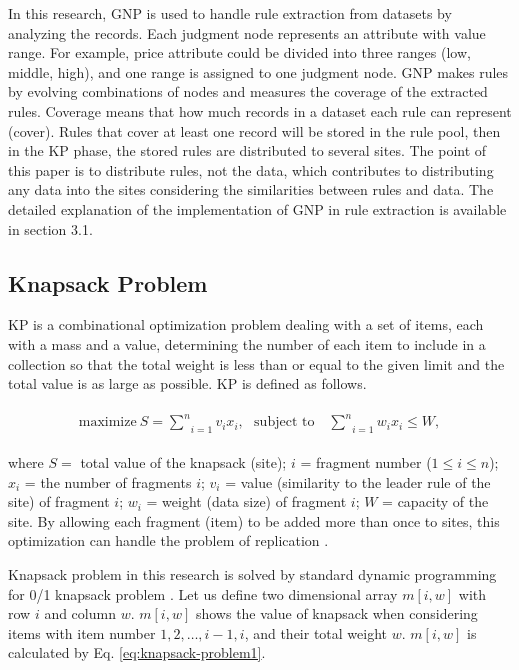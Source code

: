 \documentclass{elsart}
\begin{document}
In this research, GNP is used to handle rule extraction from datasets by analyzing the records. Each judgment node represents an attribute with value range. For example, price attribute could be divided into three ranges (low, middle, high), and one range is assigned to one judgment node. GNP makes rules by evolving combinations of nodes and measures the coverage of the extracted rules. Coverage means that how much records in a dataset each rule can represent (cover). Rules that cover at least one record will be stored in the rule pool, then in the KP phase, the stored rules are distributed to several sites. The point of this paper is to distribute rules, not the data, which contributes to distributing any data into the sites considering the similarities between rules and data. The detailed explanation of the implementation of GNP in rule extraction is available in section 3.1.

\subsection{Knapsack Problem}
KP is a combinational optimization problem dealing with a set of items, each with a mass and a value, determining the number of each item to include in a collection so that the total weight is less than or equal to the given limit and the total value is as large as possible. KP is defined as follows.

\begin{eqnarray}
\begin{array}{lll}
\text{maximize}~S=\underset{i=1}{\overset{n}{\sum}}v_{i}x_{i}, \text{~~subject to~~~} \underset{i=1}{\overset{n}{\sum}}w_{i}x_{i}\leq W,
\end{array}
\label{eq:knapsack-problem}
\end{eqnarray}

where $S=$ total value of the knapsack (site); $i$ = fragment number ($1 \leq i \leq n$); $x_{i}$ = the number of fragments $i$; $v_{i}$ = value (similarity to the leader rule of the site) of fragment $i$; $w_{i}$ = weight (data size) of fragment $i$; $W$ = capacity of the site.
By allowing each fragment (item) to be added more than once to sites, this optimization can handle the problem of replication \cite{knapsack, knapsack2}. 

Knapsack problem in this research is solved by standard dynamic programming for 0/1 knapsack problem \cite{knapsack_DP}.
Let us define two dimensional array $m[i,w]$ with row $i$ and column $w$.
$m[i,w]$ shows the value of knapsack when considering items with item number $1,2,\dots,i-1,i$, and their total weight $w$. 
$m[i,w]$ is calculated by Eq. \ref{eq:knapsack-problem1}.
\end{document}
